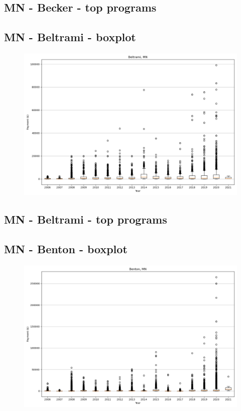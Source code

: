 \subsection*{MN - Becker - top programs}

\newpage
\subsection*{MN - Beltrami - boxplot}
\begin{figure}[h]
\centering
\includegraphics[width=7in]{../output/boxplots/counties/Beltrami-MN_boxplot.png}
\end{figure}


\subsection*{MN - Beltrami - top programs}

\newpage
\subsection*{MN - Benton - boxplot}
\begin{figure}[h]
\centering
\includegraphics[width=7in]{../output/boxplots/counties/Benton-MN_boxplot.png}
\end{figure}


